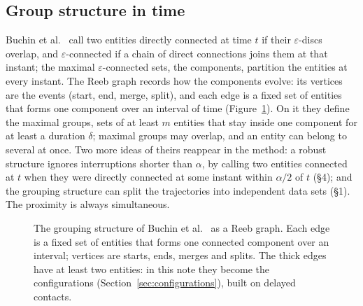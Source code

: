 \subsection{Group structure in time}

Buchin et al.~\cite{buchin2015} call two entities directly connected at time $t$ if their
$\varepsilon$-discs overlap, and $\varepsilon$-connected if a chain of direct connections joins
them at that instant; the maximal $\varepsilon$-connected sets, the components, partition the
entities at every instant. The Reeb graph records how the components evolve: its vertices are the
events (start, end, merge, split), and each edge is a fixed set of entities that forms one
component over an interval of time (Figure~\ref{fig:reeb}). On it they define the maximal groups,
sets of at least $m$ entities that stay inside one component for at least a duration $\delta$;
maximal groups may overlap, and an entity can belong to several at once. Two more ideas of theirs
reappear in the method: a robust structure ignores interruptions shorter than $\alpha$, by calling two
entities connected at $t$ when they were directly connected at some instant within $\alpha/2$ of
$t$ (§4); and the grouping structure can split the trajectories into independent data sets
(§1). The proximity is always simultaneous.

\begin{figure}
\centering
{}
\caption{The grouping structure of Buchin et al.~\cite{buchin2015} as a Reeb graph. Each edge is a
fixed set of entities that forms one connected component over an interval; vertices are starts,
ends, merges and splits. The thick edges have at least two entities: in this note they become the
configurations (Section~\ref{sec:configurations}), built on delayed contacts.}
\label{fig:reeb}
\end{figure}

